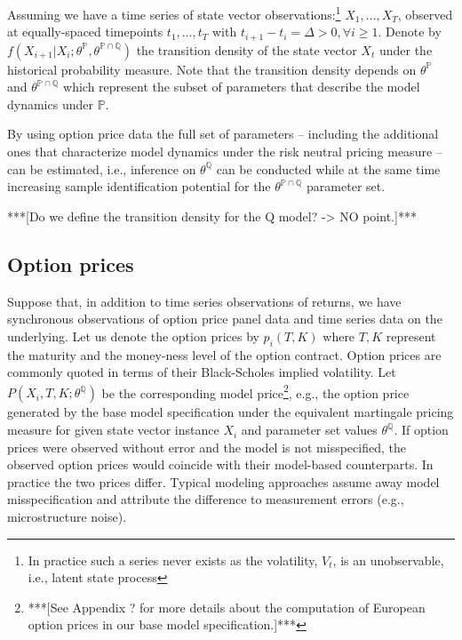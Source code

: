 \documentclass[11pt,a4paper,notitlepage]{article}
\numberwithin{equation}{section}
\begin{document}
Assuming we have a time series of state vector observations:\footnote{In practice such a series never exists as the volatility, $V_t$, is an unobservable, i.e., latent state process} $X_1, \dots, X_T$, observed at  equally-spaced timepoints $t_1,\dots,t_T$ with $t_{i+1} - t_i = \Delta >0, \forall i\geq 1 $. Denote by $f(X_{i+1} |X_i; \theta^\mathbb{P},  \theta^{\mathbb{P} \cap \mathbb{Q}})$ the transition density of the state vector $X_t$ under the historical probability measure. Note that the transition density depends on $\theta^\mathbb{P}$ and $\theta^{\mathbb{P} \cap \mathbb{Q}}$ which represent the subset of parameters that describe the model dynamics under $\mathbb{P}$.

By using option price data the full set of parameters -- including the additional ones that characterize model dynamics under the risk neutral pricing measure -- can be estimated, i.e., inference on $\theta^\mathbb{Q}$ can be conducted while at the same time increasing sample identification potential for the $\theta^{\mathbb{P} \cap \mathbb{Q}}$ parameter set. 

***[Do we define the transition density for the Q model? -> NO point.]***

\subsection{Option prices}
Suppose that, in addition to time series observations of returns, we have synchronous observations of option price panel data and time series data on the underlying. Let us denote the option prices by $p_{i}(T,K)$ where $T,K$ represent the maturity and the money-ness level of the option contract. Option prices are commonly quoted in terms of their Black-Scholes implied volatility. Let $P(X_{i},T,K; \theta^\mathbb{Q})$ be the corresponding model price\footnote{***[See Appendix ? for more details about the computation of European option prices in our base model specification.]***}, e.g., the option price generated by the base model specification under the equivalent martingale pricing measure for  given state vector instance $X_{i}$ and parameter set values $\theta^\mathbb{Q}$. If option prices were observed without error and the model is not misspecified, the observed option prices would coincide with their model-based counterparts. In practice the two prices differ. Typical modeling approaches assume away model misspecification and attribute the difference to measurement errors (e.g., microstructure noise). 
\end{document}
